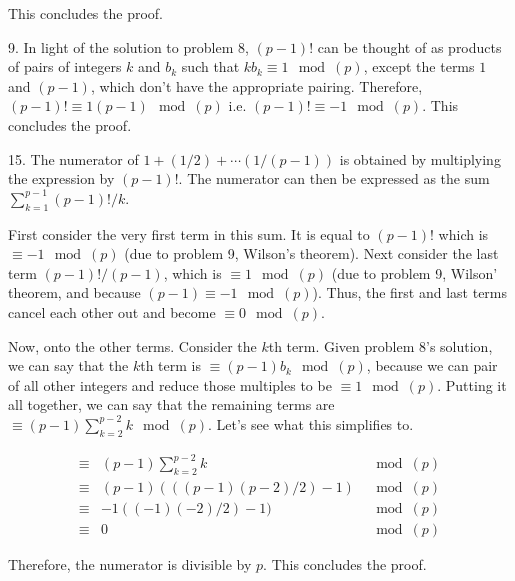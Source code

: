 \documentclass{article}
\begin{document}
This concludes the proof.

9. In light of the solution to problem 8, $(p - 1)!$ can be thought of as products of pairs of integers $k$ and $b_k$ such that $kb_k \equiv 1 \mod(p)$, except the terms $1$ and $(p - 1)$, which don't have the appropriate pairing. Therefore, $(p - 1)! \equiv 1 (p - 1) \mod(p)$ i.e. $(p - 1)! \equiv -1 \mod(p)$. This concludes the proof.

15. The numerator of $1 + (1 / 2) + \cdots (1 / (p - 1))$ is obtained by multiplying the expression by $(p - 1)!$. The numerator can then be expressed as the sum $\sum_{k = 1}^{p - 1} (p - 1)! / k$.

First consider the very first term in this sum. It is equal to $(p - 1)!$ which is $\equiv -1 \mod(p)$ (due to problem 9, Wilson's theorem). Next consider the last term $(p - 1)! / (p - 1)$, which is $\equiv 1 \mod(p)$ (due to problem 9, Wilson' theorem, and because $(p - 1) \equiv -1 \mod(p)$). Thus, the first and last terms cancel each other out and become $\equiv 0 \mod(p)$.

Now, onto the other terms. Consider the $k$th term. Given problem 8's solution, we can say that the $k$th term is $\equiv (p - 1) b_k \mod(p)$, because we can pair of all other integers and reduce those multiples to be $\equiv 1 \mod(p)$. Putting it all together, we can say that the remaining terms are $\equiv (p - 1) \sum_{k = 2}^{p - 2} k \mod(p)$. Let's see what this simplifies to.

\begin{align*}
    \equiv & (p - 1) \sum_{k = 2}^{p - 2} k & \mod(p) \\ 
    \equiv & (p - 1) (((p - 1)(p - 2) / 2) - 1) & \mod(p) \\ 
    \equiv & -1 ((- 1)(- 2) / 2) - 1) & \mod(p) \\ 
    \equiv & 0 & \mod(p)
\end{align*}

Therefore, the numerator is divisible by $p$. This concludes the proof.
\end{document}
